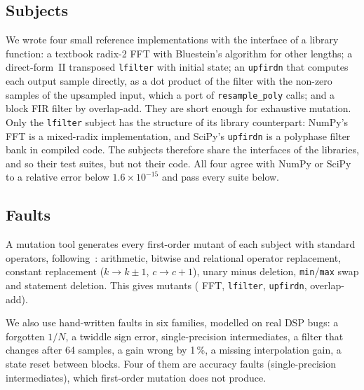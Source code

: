 \documentclass[10pt,conference]{IEEEtran}
\newcommand{\code}[1]{\texttt{#1}}
\begin{document}
\subsection{Subjects}
We wrote four small reference implementations with the interface of a library
function: a textbook radix-2 FFT with Bluestein's algorithm for other lengths;
a direct-form~II transposed \code{lfilter} with initial state; an
\code{upfirdn} that computes each output sample directly, as a dot product of
the filter with the non-zero samples of the upsampled input, which a port of
\code{resample\_poly} calls; and a block FIR filter by overlap-add. They are
short enough for exhaustive mutation. Only the \code{lfilter} subject has the
structure of its library counterpart: NumPy's FFT is a mixed-radix
implementation, and SciPy's \code{upfirdn} is a polyphase filter bank in
compiled code. The subjects therefore share the interfaces of the libraries,
and so their test suites, but not their code. All four agree with NumPy or
SciPy to a relative error below $1.6\times10^{-15}$ and pass every suite
below.

\subsection{Faults}
A mutation tool generates every first-order mutant of each subject with
standard operators, following~\cite{offutt1996mutation,jia2011mutation}: arithmetic, bitwise and
relational operator replacement, constant replacement ($k\to k\pm1$,
$c\to c+1$), unary minus deletion, \code{min}/\code{max} swap and statement
deletion. This gives \nMutAuto{} mutants (\nMutFft{} FFT, \nMutLfilter{}
\code{lfilter}, \nMutUpfirdn{} \code{upfirdn}, \nMutOla{} overlap-add).

We also use \nMutHand{} hand-written faults in six families, modelled on real
DSP bugs: a forgotten $1/N$, a twiddle sign error, single-precision
intermediates, a filter that changes after 64 samples, a gain wrong by 1\,\%, a
missing interpolation gain, a state reset between blocks. Four of them are
accuracy faults (single-precision intermediates), which first-order mutation
does not produce.
\end{document}
